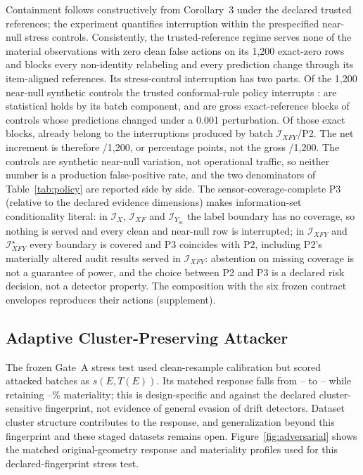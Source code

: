\documentclass[10pt,journal,compsoc]{IEEEtran}
\newcommand{\IX}{\mathcal I_X}
\newcommand{\IXF}{\mathcal I_{XF}}
\newcommand{\IYm}{\mathcal I_{Y_m}}
\newcommand{\IXFY}{\mathcal I_{XFY}}
\newcommand{\IXFYs}{\mathcal I_{XFY}^{\star}}
\begin{document}
Containment \ContainFamilyIXFYtrusted{} follows constructively from
Corollary~3 under the declared trusted references; the experiment quantifies
interruption within the prespecified near-null stress controls. Consistently, the trusted-reference regime
serves none of the \NMaterial{} material observations with zero clean false
actions on its 1,200 exact-zero rows and blocks every
non-identity relabeling and every prediction change through its item-aligned
references. Its stress-control interruption has two parts. Of the 1,200 near-null synthetic
controls the trusted conformal-rule policy interrupts
\BenignInterruptFamilyIXFYtrusted{}: \BenignHoldFamilyIXFYtrusted{} are
statistical holds by its batch component, and \TrustedGrossExactBlocks{} are
gross exact-reference blocks of controls whose predictions changed under a
0.001 perturbation. Of those exact blocks, \TrustedExactOverlap{} already
belong to the \BenignInterruptFamilyIXFY{} interruptions produced by batch
$\IXFY$/P2. The net increment is therefore
\TrustedNetAdditional{}/1,200, or \TrustedNetAdditionalPct{} percentage
points, not the gross \TrustedGrossExactBlocks{}/1,200. The controls are synthetic near-null variation,
not operational traffic, so neither number is a production false-positive
rate, and the two denominators of Table~\ref{tab:policy} are reported side by
side. The sensor-coverage-complete P3 (relative to the declared evidence
dimensions)
makes information-set conditionality literal: in $\IX$, $\IXF$ and $\IYm$
the label boundary has no coverage, so nothing is served and every clean and
near-null row is interrupted; in $\IXFY$ and $\IXFYs$ every boundary is
covered and P3 coincides with P2, including P2's \UnsafeFamilyIXFY{}
materially altered audit results served in $\IXFY$: abstention on missing coverage is not a guarantee of
power, and the choice between P2 and P3 is a declared risk decision, not a
detector property. The composition with the six frozen contract envelopes
reproduces their actions (supplement).



\subsection{Adaptive Cluster-Preserving Attacker}

The frozen Gate~A stress test used clean-resample calibration but scored attacked
batches as $s(E,T(E))$. Its matched response falls from
\AdvDetCtrlHeadlineMin--\AdvDetCtrlHeadlineMax{} to
\AdvDetAdaptHeadlineMin--\AdvDetAdaptHeadlineMax{} while retaining
\AdvMatRetentionMinPct--\AdvMatRetentionMaxPct\% materiality; this is
design-specific and against the declared cluster-sensitive fingerprint, not
evidence of general evasion of drift detectors. Dataset cluster structure
contributes to the response, and generalization beyond this fingerprint and
these staged datasets remains open.
Figure~\ref{fig:adversarial} shows the matched original-geometry response and
materiality profiles used for this declared-fingerprint stress test.
\end{document}

